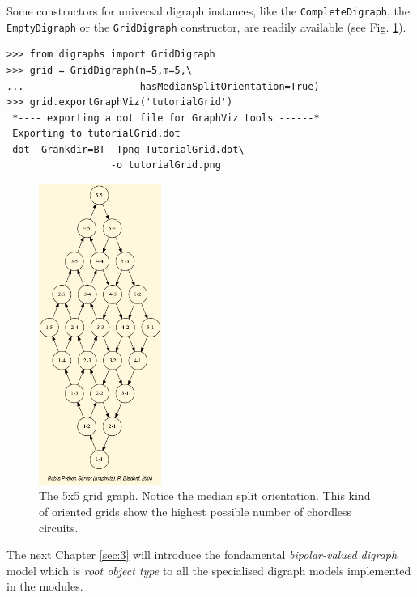 Some constructors for universal digraph instances, like the \texttt{CompleteDigraph}, the \texttt{EmptyDigraph} or the \texttt{GridDigraph} constructor, are readily available (see Fig. \ref{fig:1.3}).
\begin{lstlisting}
>>> from digraphs import GridDigraph
>>> grid = GridDigraph(n=5,m=5,\
...                    hasMedianSplitOrientation=True)
>>> grid.exportGraphViz('tutorialGrid')
 *---- exporting a dot file for GraphViz tools ------*
 Exporting to tutorialGrid.dot
 dot -Grankdir=BT -Tpng TutorialGrid.dot\
                  -o tutorialGrid.png
\end{lstlisting}
\begin{figure}[h]
\sidecaption[t]
\includegraphics[width=4cm]{Figures/tutorialGrid.png}
\caption{The 5x5 grid graph. Notice the median split orientation. This kind of oriented grids show the highest possible number of chordless circuits. }
\label{fig:1.3}       %
\end{figure}
\clearpage

The next Chapter \ref{sec:3} will introduce the fondamental \emph{bipolar-valued digraph} model which is \emph{root object type} to all the specialised digraph models implemented in the \Digraph modules.    



